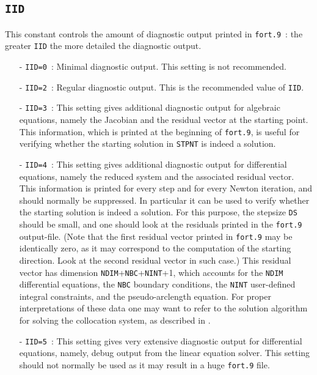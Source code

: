 \documentclass[12pt]{report}
\begin{document}
\subsection{\tt IID} \label{sec:IID} 
 This constant controls the amount of diagnostic output printed in {\tt fort.9}~:
 the greater {\tt IID} the more detailed the diagnostic output.
\begin{itemize}
\item[-] {\tt IID=0}~:  
  Minimal diagnostic output. This setting is not recommended.
\item[-] {\tt IID=2}~: 
  Regular diagnostic output. This is the recommended value of {\tt IID}.
\item[-] {\tt IID=3}~: 
  This setting gives additional diagnostic output for algebraic equations,
  namely the Jacobian and the residual vector at the starting point.
  This information, which is printed at the beginning of {\tt fort.9},
  is useful for verifying whether the starting solution in {\tt STPNT} is indeed 
  a solution.
\item[-] {\tt IID=4}~: 
  This setting gives additional diagnostic output for differential equations,
  namely the reduced system and the associated residual vector. 
  This information is printed for every step and for every Newton iteration,
  and should normally be suppressed.
  In particular it can be used to verify whether the starting solution
  is indeed a solution. For this purpose, the stepsize {\tt DS} should
  be small, and one should look at the residuals printed in the {\tt fort.9}
  output-file. (Note that the first residual vector printed in {\tt fort.9} may
  be identically zero, as it may correspond to the computation of the starting
  direction. Look at the second residual vector in such case.)
  This residual vector has dimension 
  {\tt NDIM}+{\tt NBC}+{\tt NINT}+1, which accounts for the {\tt NDIM}
  differential equations, the {\tt NBC} boundary conditions, the {\tt NINT} user-defined
  integral constraints, and the pseudo-arclength equation.
  For proper interpretations of these data one may want to refer to the solution
  algorithm for solving the collocation system, as described in
   \citeyear{DoKeKe:91b}.
\item[-] {\tt IID=5}~:
  This setting gives very extensive diagnostic output for differential equations,
  namely, debug output from the linear equation solver.
  This setting should not normally be used as it may result
  in a huge {\tt fort.9} file. 
\end{itemize}
\end{document}
